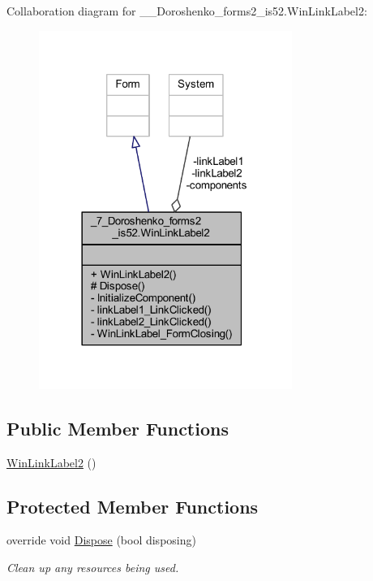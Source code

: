 Collaboration diagram for \+\_\+\_\+\+Doroshenko\+\_\+forms2\+\_\+is52.\+Win\+Link\+Label2\+:
\nopagebreak
\begin{figure}[H]
\begin{center}
\leavevmode
\includegraphics[width=234pt]{class__7___doroshenko__forms2__is52_1_1_win_link_label2__coll__graph}
\end{center}
\end{figure}
\subsection*{Public Member Functions}
\begin{DoxyCompactItemize}
\item 
\hyperlink{class__7___doroshenko__forms2__is52_1_1_win_link_label2_ae5b9767da47dfc2718254a3a92b10ce8}{Win\+Link\+Label2} ()
\end{DoxyCompactItemize}
\subsection*{Protected Member Functions}
\begin{DoxyCompactItemize}
\item 
override void \hyperlink{class__7___doroshenko__forms2__is52_1_1_win_link_label2_a2eb3b8d18cbe816ea81850eab14cf911}{Dispose} (bool disposing)
\begin{DoxyCompactList}\small\item\em Clean up any resources being used. \end{DoxyCompactList}\end{DoxyCompactItemize}
